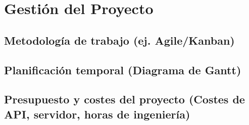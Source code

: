 \chapter{\textbf{Gestión del Proyecto}}
\label{ch:Plani}
\thispagestyle{fancy} %

\section{Metodología de trabajo (ej. Agile/Kanban)}
\label{sec:metodologia_trabajo}

\textoBase

\section{Planificación temporal (Diagrama de Gantt)}
\label{sec:planificacion_temporal}

\textoBaseAlt


\section{Presupuesto y costes del proyecto (Costes de API, servidor, horas de ingeniería)}
\label{sec:presupuesto_costes}

\textoBase